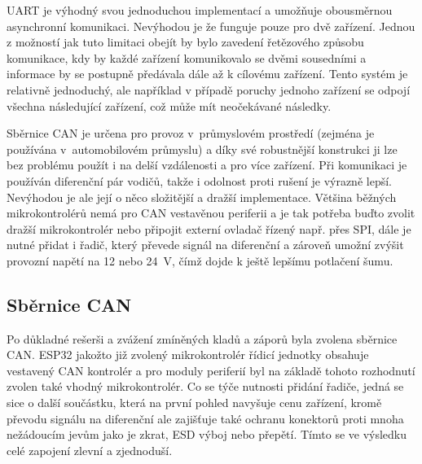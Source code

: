         UART je výhodný svou jednoduchou implementací a umožňuje obousměrnou asynchronní komunikaci. Nevýhodou je že funguje pouze pro dvě zařízení. Jednou z možností jak tuto limitaci obejít by bylo zavedení řetězového způsobu komunikace, kdy by každé zařízení komunikovalo se dvěmi sousedními a informace by se postupně předávala dále až k cílovému zařízení. Tento systém je relativně jednoduchý, ale například v případě poruchy jednoho zařízení se odpojí všechna následující zařízení, což může mít neočekávané následky.

        Sběrnice CAN je určena pro provoz v~průmyslovém prostředí (zejména je používána v~automobilovém průmyslu) a díky své robustnější konstrukci ji lze bez problému použít i na delší vzdálenosti a pro více zařízení. Při komunikaci je používán diferenční pár vodičů, takže i odolnost proti rušení je výrazně lepší. Nevýhodou je ale její o něco složitější a dražší implementace. Většina běžných mikrokontrolérů nemá pro CAN vestavěnou periferii a je tak potřeba buďto zvolit dražší mikrokontrolér nebo připojit externí ovladač řízený např. přes SPI, dále je nutné přidat i řadič, který převede signál na diferenční a zároveň umožní zvýšit provozní napětí na 12  nebo \qty{24}{V}, čímž dojde k ještě lepšímu potlačení šumu.

    \subsection{Sběrnice CAN}
        Po důkladné rešerši a zvážení zmíněných kladů a záporů byla  zvolena sběrnice CAN. ESP32 jakožto již zvolený mikrokontrolér řídicí jednotky obsahuje vestavený CAN kontrolér a pro moduly periferií byl na základě tohoto rozhodnutí zvolen také vhodný mikrokontrolér. Co se týče nutnosti přidání řadiče, jedná se sice o další součástku, která na první pohled navyšuje cenu zařízení, kromě převodu signálu na diferenční ale zajišťuje také ochranu konektorů proti mnoha nežádoucím jevům jako je zkrat, ESD výboj nebo přepětí. Tímto se ve výsledku celé zapojení zlevní a zjednoduší.


   
